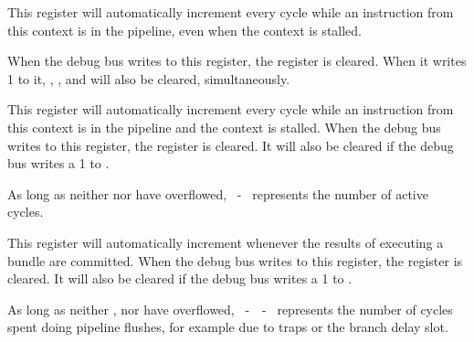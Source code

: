 
This register will automatically increment every cycle while an instruction from
this context is in the pipeline, even when the context is stalled.

When the debug bus writes to this register, the register is cleared. When it
writes 1 to it, , ,  and  will also be
cleared, simultaneously.

\debugCanWrite{}


This register will automatically increment every cycle while an instruction from 
this context is in the pipeline and the context is stalled. When the debug bus 
writes to this register, the register is cleared. It will also be cleared if the 
debug bus writes a 1 to .

As long as neither  nor  have overflowed,
~-~ represents the number of active cycles.

\debugCanWrite{}


This register will automatically increment whenever the results of executing a 
bundle are committed. When the debug bus writes to this register, the register 
is cleared. It will also be cleared if the debug bus writes a 1 to .

As long as neither ,  nor  have overflowed,
~-~~-~ represents the number of cycles spent
doing pipeline flushes, for example due to traps or the branch delay slot.

\debugCanWrite{}


